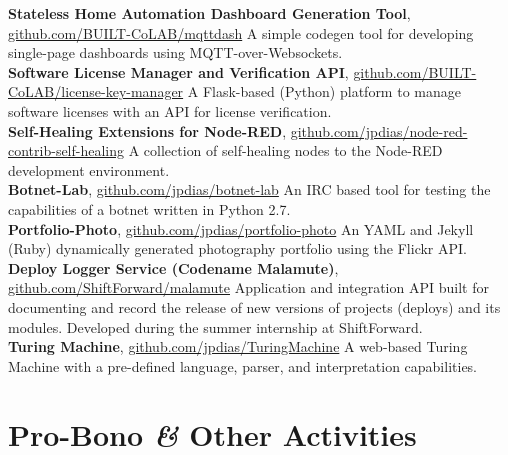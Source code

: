 \documentclass[10pt, a4paper]{article}
\newcommand{\years}[1]{\marginnote{\raggedleft\footnotesize #1}}
\begin{document}
\years{2022---} 
\textbf{Stateless Home Automation Dashboard Generation Tool}, 
\href{https://github.com/BUILT-CoLAB/mqttdash}{github.com/BUILT-CoLAB/mqttdash}
\newline
A simple codegen tool for developing single-page dashboards using MQTT-over-Websockets. 
\\[0.42em]
\textbf{Software License Manager and Verification API}, 
\href{https://github.com/BUILT-CoLAB/license-key-manager}{github.com/BUILT-CoLAB/license-key-manager}
\newline
A Flask-based (Python) platform to manage software licenses with an API for license verification.
\\[0.42em]
\years{2019---} 
\textbf{Self-Healing Extensions for Node-RED}, 
\href{https://github.com/jpdias/node-red-contrib-self-healing}{github.com/jpdias/node-red-contrib-self-healing}
\newline
A collection of self-healing nodes to the Node-RED development environment.
\\[0.42em]
\years{2016--2017} 
\textbf{Botnet-Lab}, 
\href{https://github.com/jpdias/botnet-lab}{github.com/jpdias/botnet-lab}
\newline
An IRC based tool for testing the capabilities of a botnet written in Python 2.7. 
\\
\years{2016} 
\textbf{Portfolio-Photo}, 
\href{https://github.com/jpdias/portfolio-photo}{github.com/jpdias/portfolio-photo}
\newline
An YAML and Jekyll (Ruby) dynamically generated photography portfolio using the Flickr API.
\\[0.42em]
\years{2015} 
\textbf{Deploy Logger Service (Codename Malamute)}, 
\href{https://github.com/ShiftForward/malamute}{github.com/ShiftForward/malamute}
\newline
Application and integration API built for documenting and record the release of new versions of projects (deploys) and its modules. Developed during the summer internship at ShiftForward.
\\[0.42em]
\years{2014--2015} 
\textbf{Turing Machine}, 
\href{https://github.com/jpdias/TuringMachine/}{github.com/jpdias/TuringMachine}
\newline
A web-based Turing Machine with a pre-defined language, parser, and interpretation capabilities.



\section*{Pro-Bono \textit{\&} Other Activities}
\end{document}
